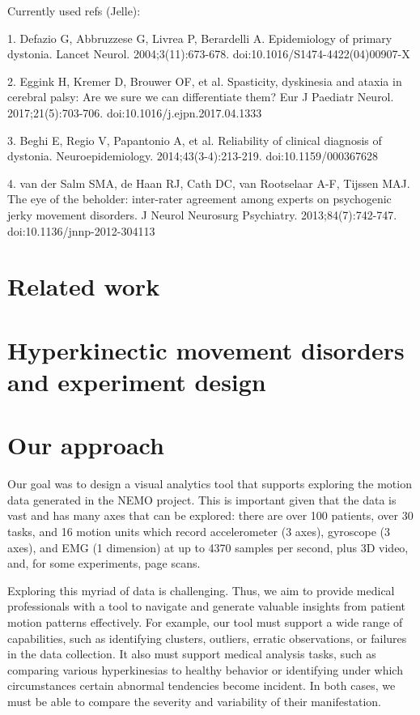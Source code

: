 Currently used refs (Jelle): 

1. Defazio G, Abbruzzese G, Livrea P, Berardelli A. Epidemiology of primary dystonia. Lancet Neurol. 2004;3(11):673-678. doi:10.1016/S1474-4422(04)00907-X

2. Eggink H, Kremer D, Brouwer OF, et al. Spasticity, dyskinesia and ataxia in cerebral palsy: Are we sure we can differentiate them? Eur J Paediatr Neurol. 2017;21(5):703-706. doi:10.1016/j.ejpn.2017.04.1333

3. Beghi E, Regio V, Papantonio A, et al. Reliability of clinical diagnosis of dystonia. Neuroepidemiology. 2014;43(3-4):213-219. doi:10.1159/000367628

4. van der Salm SMA, de Haan RJ, Cath DC, van Rootselaar A-F, Tijssen MAJ. The eye of the beholder: inter-rater agreement among experts on psychogenic jerky movement disorders. J Neurol Neurosurg Psychiatry. 2013;84(7):742-747. doi:10.1136/jnnp-2012-304113




\section{Related work}

\section{Hyperkinectic movement disorders and experiment design}

\section{Our approach}

Our goal was to design a visual analytics tool that supports exploring the motion data generated in the NEMO project. This is important given that the data is vast and has many axes that can be explored: there are over 100 patients, over 30 tasks, and 16 motion units which record accelerometer (3 axes), gyroscope (3 axes), and EMG (1 dimension) at up to 4370 samples per second, plus 3D video, and, for some experiments, page scans. 

Exploring this myriad of data is challenging. Thus, we aim to provide medical professionals with a tool to navigate and generate valuable insights from patient motion patterns effectively. For example, our tool must support a wide range of capabilities, such as identifying clusters, outliers, erratic observations, or failures in the data collection. It also must support medical analysis tasks, such as comparing various hyperkinesias to healthy behavior or identifying under which circumstances certain abnormal tendencies become incident. In both cases, we must be able to compare the severity and variability of their manifestation.

